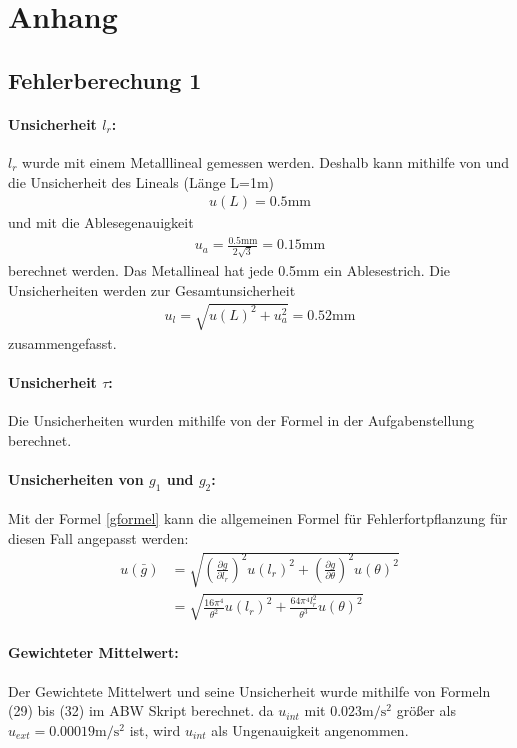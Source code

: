 \documentclass[11pt, a4paper]{article}
\begin{document}
    \section{Anhang}
    \subsection{Fehlerberechung 1}
    
    \paragraph{Unsicherheit $l_r$:}
    $l_r$ wurde mit einem Metalllineal gemessen werden. Deshalb kann mithilfe von \cite[Gleichung (40)]{ABW}
    und \cite[Tabelle 5]{ABW} die Unsicherheit des Lineals (Länge L=1m)
    \begin{align}
        u(L) = 0.5\si{\milli\metre}
    \end{align}
    und mit \cite[Tabelle 1]{ABW} die Ablesegenauigkeit
    \begin{align}
        u_a = \frac{0.5\si{\milli\metre}}{2\sqrt{3}} = 0.15\si{\milli\metre}
    \end{align}
    berechnet werden. Das Metallineal hat jede 0.5mm ein Ablesestrich.
    Die Unsicherheiten werden zur Gesamtunsicherheit
    \begin{align}
        u_l = \sqrt{u(L)^2 + u_a^2 } = 0.52\si{\milli\metre}
    \end{align} 
    zusammengefasst.
    \paragraph{Unsicherheit $\tau$:}
    Die Unsicherheiten wurden mithilfe von der Formel in der Aufgabenstellung \cite[Aufgabe 8]{pen} berechnet.

    \paragraph{Unsicherheiten von $g_1$ und $g_2$:}
    Mit der Formel \ref{gformel} kann die allgemeinen Formel für Fehlerfortpflanzung
     \cite[Formel (20)]{ABW} für diesen Fall angepasst werden:
     \begin{align}
         u(\bar{g}) &= \sqrt{\left(\frac{\partial g}{\partial l_r}\right)^2 u(l_r)^2 +
         \left(\frac{\partial g}{\partial \theta}\right)^2 u(\theta)^2} \nonumber \\
         &= \sqrt{\frac{16\pi^4}{\theta^2} u(l_r)^2 + \frac{64\pi^4l_r^2}{\theta^3} u(\theta)^2}
     \end{align}
    \paragraph{Gewichteter Mittelwert:}
    Der Gewichtete Mittelwert und seine Unsicherheit wurde mithilfe von
    Formeln (29) bis (32) im ABW Skript\cite{ABW} berechnet. da $u_{int}$ mit $0.023\si{\metre\per\square\second}$
    größer als $u_{ext} = 0.00019\si{\metre\per\square\second}$ ist, wird $u_{int}$ als Ungenauigkeit angenommen.


    
    
\end{document}
